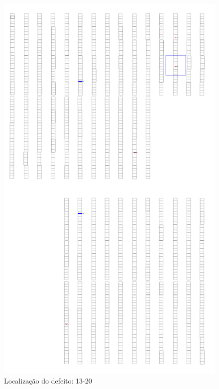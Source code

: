 \documentclass[dvipsnames]{article}%
\begin{document}
\begin{figure}[h!]%
\begin{minipage}{0.31\linewidth}%
\centering%
\centering%
\includegraphics[width=\linewidth]{report_images/hotspots_13-20_map.jpg}%
\caption{Localização do defeito: 13-20}%
\end{minipage}%
\hfill%
\begin{minipage}{0.31\linewidth}%
\centering%
\centering%

\end{minipage}
\end{figure}
\end{document}
